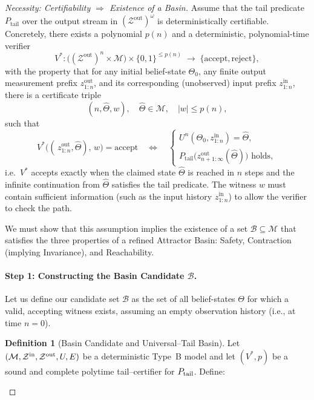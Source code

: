 \documentclass[12pt]{article}
\theoremstyle{definition}
\newtheorem{definition}{Definition}[section]
\theoremstyle{plain}
\begin{document}
\begin{proof}[Necessity: Certifiability $\Rightarrow$ Existence of a Basin]
Assume that the tail predicate \(P_{\mathrm{tail}}\) over the output stream in $(\mathcal{Z}^{\text{out}})^\omega$ is deterministically certifiable. Concretely, there exists a polynomial \(p(n)\) and a deterministic, polynomial‑time verifier
\[
  V^*:\bigl((\mathcal Z^{\text{out}})^n\times\mathcal M\bigr)\times\{0,1\}^{\le p(n)}
     \;\longrightarrow\;\{\mathrm{accept},\mathrm{reject}\},
\]
with the property that for any initial belief‑state \(\Theta_0\), any finite output measurement prefix \(z^{\text{out}}_{1:n}\), and its corresponding (unobserved) input prefix $z^{\text{in}}_{1:n}$, there is a certificate triple
\[
  (n,\widehat\Theta,w),
  \quad
  \widehat\Theta\in\mathcal M,\quad |w|\le p(n),
\]
such that
\[
  V^*\bigl((\,z^{\text{out}}_{1:n},\widehat\Theta),\,w\bigr)
  = \mathrm{accept}
  \quad\Longleftrightarrow\quad
  \begin{cases}
    U^n(\Theta_0,z^{\text{in}}_{1:n}) = \widehat\Theta,\\[6pt]
    P_{\mathrm{tail}}\bigl(z^{\text{out}}_{n+1:\infty}(\widehat\Theta)\bigr)
    \text{ holds},
  \end{cases}
\]
i.e.\ \(V^*\) accepts exactly when the claimed state \(\widehat\Theta\) is reached in \(n\) steps and the infinite continuation from \(\widehat\Theta\) satisfies the tail predicate. The witness $w$ must contain sufficient information (such as the input history $z^{\text{in}}_{1:n}$) to allow the verifier to check the path.  

We must show that this assumption implies the existence of a set $\mathcal{B} \subseteq \mathcal{M}$ that satisfies the three properties of a refined Attractor Basin: Safety, Contraction (implying Invariance), and Reachability.

\paragraph{Step 1: Constructing the Basin Candidate $\mathcal{B}$.}
Let us define our candidate set $\mathcal{B}$ as the set of all belief-states $\Theta$ for which a valid, accepting witness exists, assuming an empty observation history (i.e., at time $n=0$).
\begin{definition}[Basin Candidate and Universal–Tail Basin]
\label{def:basin-candidate-updated}
Let $(\mathcal M,\mathcal Z^{\rm in},\mathcal Z^{\rm out},U,E)$ be a deterministic Type~B model and let $(V^*,p)$ be a sound and complete polytime tail–certifier for $P_{\rm tail}$. Define:


\end{definition}
\end{proof}
\end{document}
